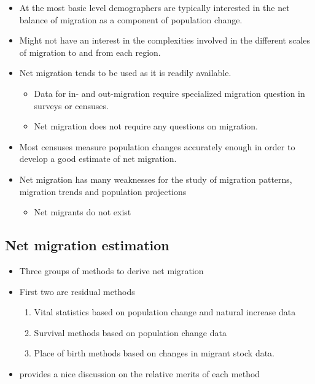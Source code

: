 \documentclass[
]{book}
\providecommand{\tightlist}{%
  \setlength{\itemsep}{0pt}\setlength{\parskip}{0pt}}
\begin{document}
\begin{itemize}
\tightlist
\item
  At the most basic level demographers are typically interested in the net balance of migration as a component of population change.
\item
  Might not have an interest in the complexities involved in the different scales of migration to and from each region.
\item
  Net migration tends to be used as it is readily available.

  \begin{itemize}
  \tightlist
  \item
    Data for in- and out-migration require specialized migration question in surveys or censuses.
  \item
    Net migration does not require any questions on migration.
  \end{itemize}
\item
  Most censuses measure population changes accurately enough in order to develop a good estimate of net migration.
\item
  Net migration has many weaknesses for the study of migration patterns, migration trends and population projections \citet{rogers1990rnm}

  \begin{itemize}
  \tightlist
  \item
    Net migrants do not exist
  \end{itemize}
\end{itemize}

\hypertarget{net-migration-estimation}{%
\subsection{Net migration estimation}\label{net-migration-estimation}}

\begin{itemize}
\item
  Three groups of methods to derive net migration
\item
  First two are residual methods

  \begin{enumerate}
  \def\labelenumi{\arabic{enumi}.}
  \tightlist
  \item
    Vital statistics based on population change and natural increase data
  \item
    Survival methods based on population change data
  \item
    Place of birth methods based on changes in migrant stock data.
  \end{enumerate}
\item
  \citet{UnitedNations1983} provides a nice discussion on the relative merits of each method
\end{itemize}
\end{document}
